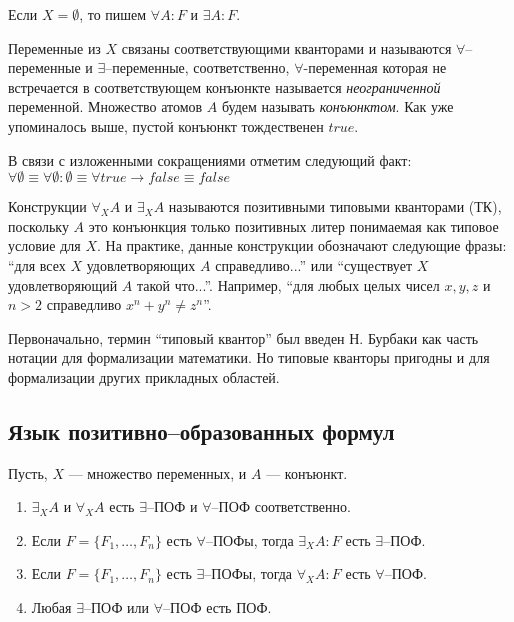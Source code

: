 Если $X = \emptyset$, то пишем $\forall A\colon F$ и $\exists A\colon F$.


Переменные из $X$ связаны соответствующими кванторами и называются $\forall$--переменные и $\exists$--переменные, соответственно, $\forall$-переменная которая не встречается в соответствующем конъюнкте называется {\em неограниченной} переменной. Множество атомов $A$ будем называть {\em конъюнктом}. Как уже упоминалось выше, пустой конъюнкт тождественен $true$.

В связи с изложенными сокращениями отметим следующий факт: $\forall \emptyset \equiv \forall \emptyset:\emptyset \equiv \forall true \rightarrow false \equiv false$

Конструкции $\forall_XA$ и $\exists_XA$ называются позитивными типовыми кванторами (ТК), поскольку $A$ это конъюнкция только позитивных литер понимаемая как типовое условие для $X$. На практике, данные конструкции обозначают следующие фразы: ``для всех $X$ удовлетворяющих $A$ справедливо...'' или ``существует $X$ удовлетворяющий $A$ такой что...''. Например, ``для любых целых чисел $x,y,z$ и $n>2$ справедливо $x^n + y^n \ne z^n$''.

Первоначально, термин ``типовый квантор'' был введен Н. Бурбаки \cite{Bourbaki} как часть нотации для формализации математики. Но типовые кванторы пригодны и для формализации других прикладных областей.



\subsection{Язык позитивно--образованных формул}


\begin{definition}
\label{def:pcf}
Пусть, $X$ --- множество переменных, и $A$ --- конъюнкт.
\begin{enumerate}

\item $\exists_XA$ и $\forall_XA$ есть $\exists$--ПОФ и $\forall$--ПОФ соответственно.

\item Если $F = \{F_1,\ldots,F_n\}$ есть $\forall$--ПОФы, тогда $\exists_XA\colon F$ есть $\exists$--ПОФ.

\item Если $F = \{F_1,\ldots,F_n\}$ есть $\exists$--ПОФы, тогда $\forall_XA\colon F$ есть $\forall$--ПОФ.

\item Любая $\exists$--ПОФ или $\forall$--ПОФ есть ПОФ.
\end{enumerate}
\end{definition}

